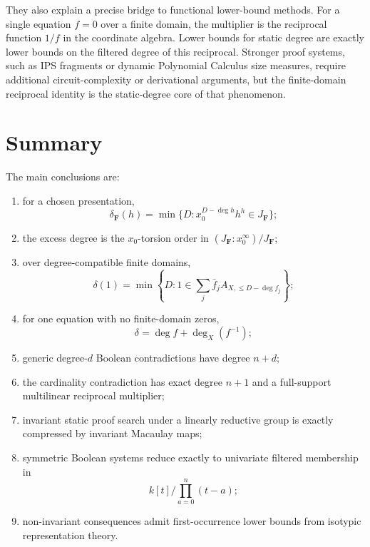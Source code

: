 \documentclass[11pt]{article}
\begin{document}
They also explain a precise bridge to functional lower-bound methods. For a single equation \(f=0\) over a finite domain, the multiplier is the reciprocal function \(1/f\) in the coordinate algebra. Lower bounds for static degree are exactly lower bounds on the filtered degree of this reciprocal. Stronger proof systems, such as IPS fragments or dynamic Polynomial Calculus size measures, require additional circuit-complexity or derivational arguments, but the finite-domain reciprocal identity is the static-degree core of that phenomenon.

\section{Summary}

The main conclusions are:
\begin{enumerate}[label=(\roman*)]
\item for a chosen presentation,
\[
\delta_{\mathbf F}(h)=\min\{D:x_0^{D-\deg h}h^h\in J_{\mathbf F}\};
\]
\item the excess degree is the \(x_0\)-torsion order in \((J_{\mathbf F}:x_0^\infty)/J_{\mathbf F}\);
\item over degree-compatible finite domains,
\[
\delta(1)=
\min\left\{D:
1\in\sum_j \bar f_j A_{X,\le D-\deg f_j}
\right\};
\]
\item for one equation with no finite-domain zeros,
\[
\delta=\deg f+\deg_X(f^{-1});
\]
\item generic degree-\(d\) Boolean contradictions have degree \(n+d\);
\item the cardinality contradiction has exact degree \(n+1\) and a full-support multilinear reciprocal multiplier;
\item invariant static proof search under a linearly reductive group is exactly compressed by invariant Macaulay maps;
\item symmetric Boolean systems reduce exactly to univariate filtered membership in
\[
k[t]/\prod_{a=0}^n(t-a);
\]
\item non-invariant consequences admit first-occurrence lower bounds from isotypic representation theory.
\end{enumerate}
\end{document}
